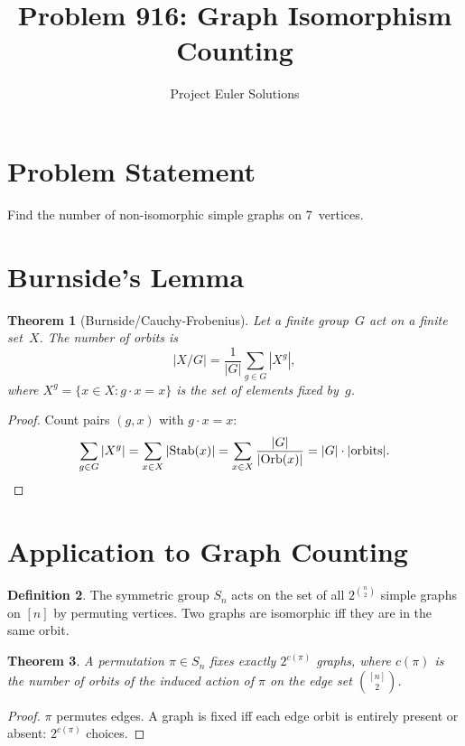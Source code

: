 \documentclass[11pt]{article}
\title{Problem 916: Graph Isomorphism Counting}
\author{Project Euler Solutions}
\date{}
\newtheorem{theorem}{Theorem}
\theoremstyle{definition}
\newtheorem{definition}[theorem]{Definition}
\begin{document}
\maketitle

\section{Problem Statement}

Find the number of non-isomorphic simple graphs on 7~vertices.

\section{Burnside's Lemma}

\begin{theorem}[Burnside/Cauchy-Frobenius]
Let a finite group~$G$ act on a finite set~$X$. The number of orbits is
\[
|X/G| = \frac{1}{|G|}\sum_{g \in G}|X^g|,
\]
where $X^g = \{x \in X : g \cdot x = x\}$ is the set of elements fixed by~$g$.
\end{theorem}

\begin{proof}
Count pairs $(g,x)$ with $g \cdot x = x$:
\[
\sum_{g \in G}|X^g| = \sum_{x \in X}|\mathrm{Stab}(x)| = \sum_{x \in X}\frac{|G|}{|\mathrm{Orb}(x)|} = |G|\cdot|\text{orbits}|. \qedhere
\]
\end{proof}

\section{Application to Graph Counting}

\begin{definition}
The symmetric group $S_n$ acts on the set of all $2^{\binom{n}{2}}$ simple graphs on $[n]$ by permuting vertices. Two graphs are isomorphic iff they are in the same orbit.
\end{definition}

\begin{theorem}
A permutation $\pi \in S_n$ fixes exactly $2^{c(\pi)}$ graphs, where $c(\pi)$ is the number of orbits of the induced action of $\pi$ on the edge set $\binom{[n]}{2}$.
\end{theorem}

\begin{proof}
$\pi$ permutes edges. A graph is fixed iff each edge orbit is entirely present or absent: $2^{c(\pi)}$ choices.
\end{proof}
\end{document}
